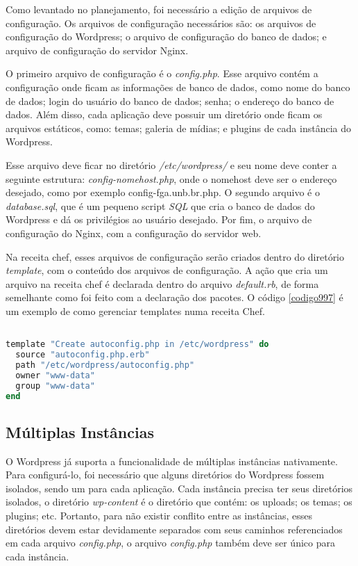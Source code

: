 Como levantado no planejamento, foi necessário a edição de arquivos de configuração. Os
arquivos de configuração necessários são: os arquivos de configuração do Wordpress; 
o arquivo de configuração do banco de dados; e arquivo de configuração do servidor Nginx.

O primeiro arquivo de configuração é o \textit{config.php}. Esse arquivo contém a
configuração onde ficam as informações de banco de dados, como nome do banco de dados;
login do usuário do banco de dados; senha; o endereço do banco de dados. Além disso,
cada aplicação deve possuir um diretório
onde ficam os arquivos estáticos, como: temas; galeria de mídias; e plugins 
de cada instância do Wordpress.

Esse arquivo deve ficar no diretório \textit{/etc/wordpress/} e seu nome deve conter
a seguinte estrutura: \textit{config-nomehost.php}, onde o nomehost deve ser o endereço
desejado, como por exemplo config-fga.unb.br.php. O segundo arquivo é o \textit{database.sql}, que é um pequeno script \textit{SQL} que
cria o banco de dados do Wordpress e dá os privilégios ao usuário desejado. Por fim,
o arquivo de configuração do Nginx, com a configuração do servidor web.

Na receita chef, esses arquivos de configuração serão criados dentro do diretório 
\textit{template}, com o conteúdo dos arquivos de configuração. A ação que cria 
um arquivo na receita chef é 
declarada dentro do arquivo \textit{default.rb}, de forma semelhante como foi feito com
a declaração dos pacotes. O código \ref{codigo997} é um exemplo de como 
gerenciar templates numa receita Chef.

\begin{lstlisting}[language=Ruby,label=dice_index,caption={Exemplo de criação de templates com o chef}, label=codigo997]

template "Create autoconfig.php in /etc/wordpress" do
  source "autoconfig.php.erb"
  path "/etc/wordpress/autoconfig.php"
  owner "www-data"
  group "www-data"
end
\end{lstlisting}

\subsection{Múltiplas Instâncias}

O Wordpress já suporta a funcionalidade de múltiplas instâncias nativamente. 
Para configurá-lo, foi necessário que alguns diretórios do Wordpress
fossem isolados, sendo um para cada aplicação. Cada instância precisa
ter seus diretórios isolados, o diretório \textit{wp-content} é o diretório 
que contém: os uploads; os temas; os plugins; etc. Portanto, para não
existir conflito entre as instâncias, esses diretórios devem estar devidamente separados
com seus caminhos referenciados em cada arquivo \textit{config.php}, o arquivo 
\textit{config.php} também
deve ser único para cada instância. 

